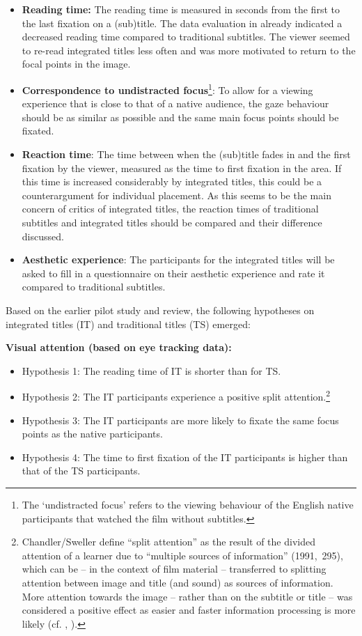 \documentclass[output=paper]{langsci/langscibook}
\begin{document}
\begin{itemize}
\item \textbf{Reading time:} The reading time is measured in seconds from the first to the last fixation on a (sub)title. The data evaluation in \citet{fox2012} already indicated a decreased reading time compared to traditional subtitles. The viewer seemed to re-read integrated titles less often and was more motivated to return to the focal points in the image.
\item \textbf{Correspondence to undistracted focus}\footnote{The ‘undistracted focus’ refers to the viewing behaviour of the English native participants that watched the film without subtitles.}: To allow for a viewing experience that is close to that of a native audience, the gaze behaviour should be as similar as possible and the same main focus points should be fixated.
\item \textbf{Reaction time}: The time between when the (sub)title fades in and the first fixation by the viewer, measured as the time to first fixation in the area. If this time is increased considerably by integrated titles, this could be a counterargument for individual placement. As this seems to be the main concern of critics of integrated titles, the reaction times of traditional subtitles and integrated titles should be compared and their difference discussed.
\item \textbf{Aesthetic experience}: The participants for the integrated titles will be asked to fill in a questionnaire on their aesthetic experience and rate it compared to traditional subtitles.
\end{itemize}


Based on the earlier pilot study and review, the following hypotheses on integrated titles (IT) and traditional titles (TS) emerged:

\textbf{Visual attention (based on eye tracking data):}

\begin{itemize}
\item Hypothesis 1: The reading time of IT is shorter than for TS.
\item Hypothesis 2: The IT participants experience a positive split attention.\footnote{Chandler/Sweller define “split attention” as the result of the divided attention of a learner due to “multiple sources of information” (1991,~295), which can be – in the context of film material –  transferred to splitting attention between image and title (and sound) as sources of information. More attention towards the image – rather than on the subtitle or title – was considered a positive effect as easier and faster information processing is more likely (cf. \citet[p. 151]{drescher1997}, \citet{grady1993}).}
\item Hypothesis 3: The IT participants are more likely to fixate the same focus points as the native participants.
\item Hypothesis 4: The time to first fixation of the IT participants is higher than that of the TS participants.
\end{itemize}
\end{document}
